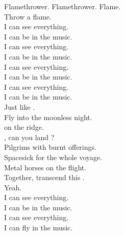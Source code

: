 
Flamethrower. Flamethrower. Flame. \\
Throw a flame. \\

I can see everything. \\
I can be in the music. \\
I can see everything. \\
I can be in the music. \\

I can see everything. \\
I can be in the music. \\
I can see everything. \\
I can be in the music. \\

Just like . \\
Fly into the moonless night. \\
 on the ridge. \\
, can you land ? \\
Pilgrims with burnt offerings. \\
Spacesick for the whole voyage. \\
Metal horses on the flight. \\
Together, transcend this . \\
Yeah. \\

I can see everything. \\
I can be in the music. \\
I can see everything. \\
I can fly in the music. \\
